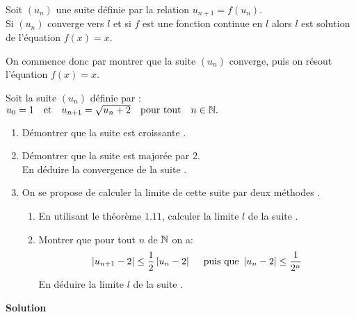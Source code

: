  \begin{theorem}
  Soit $(u_{n})$ une suite définie par la relation  $ u_{n+1}=f(u_{n}) $. \\
   Si $(u_{n})$ converge vers $ l $ et si $ f $ est une fonction continue en $ l $ alors $ l $ est solution de l'équation  $ f(x)=x $.
   \end{theorem}
   \begin{remark}
   On commence donc par  montrer que la suite $(u_{n})$ converge, puis on résout l'équation $ f(x)=x $.
   \end{remark}
   \begin{exercice}
 Soit la suite $(u_{n})$ définie par : \\
 $ u_{0} = 1 \quad \textrm{et}  \quad u_{n+1} = \sqrt{u_{n}+2 }  \quad \textrm{pour tout} \quad  n\in \mathbb{N} .$ 
 \begin{enumerate}
 \item Démontrer que la suite  est croissante .
 \item Démontrer que la suite est majorée par 2. \\
 En déduire la convergence de la suite .
 \item On se propose de calculer la limite de cette suite par deux méthodes .
 \begin{enumerate}
 \item  En utilisant le théorème $ 1.11 $, calculer la limite $ l $ de la suite .
 \item Montrer que pour tout $ n$ de $ \mathbb{N} $ on a: \[\left\lvert  u_{n+1} -2 \right\rvert
 \leq \frac{1}{2}\left\lvert u_{n}-2 \right\rvert \quad \textrm{ puis que }\left\lvert u_{n}-2 \right\rvert
\leq\frac{1}{2^{n}}\] En déduire la limite $ l $ de la suite .
 \end{enumerate}
\end{enumerate}
\end{exercice}
\textbf{Solution}
